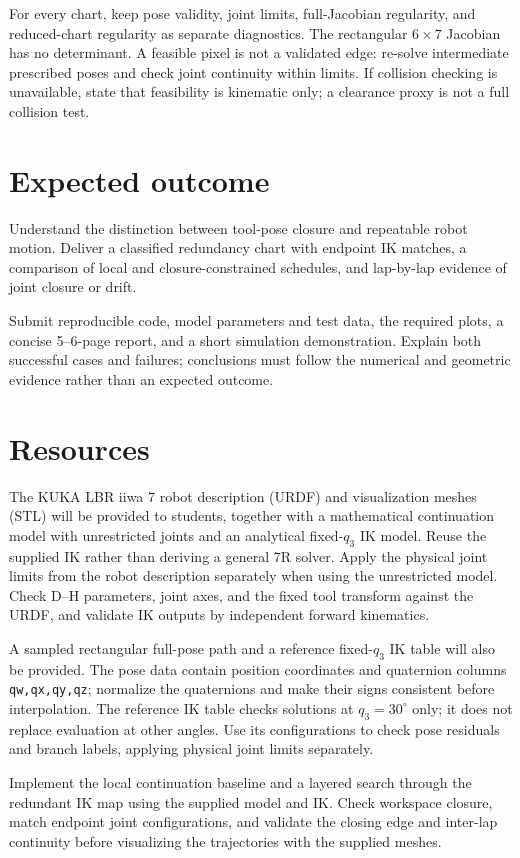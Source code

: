 \documentclass[11pt,a4paper]{article}
\begin{document}
For every chart, keep pose validity, joint limits,
full-Jacobian regularity, and reduced-chart regularity as separate diagnostics.
The rectangular $6\times7$ Jacobian has no determinant. A feasible pixel is
not a validated edge: re-solve intermediate prescribed poses and check joint
continuity within limits. If collision checking is unavailable, state that
feasibility is kinematic only; a clearance proxy is not a full collision test.

\section*{Expected outcome}
Understand the distinction between tool-pose closure and repeatable
robot motion. Deliver a classified redundancy chart with endpoint IK
matches, a comparison of local and closure-constrained schedules, and
lap-by-lap evidence of joint closure or drift.

Submit reproducible code, model parameters and test data, the required plots,
a concise 5--6-page report, and a short simulation demonstration. Explain
both successful cases and failures; conclusions must follow the numerical
and geometric evidence rather than an expected outcome.

\section*{Resources}
The KUKA LBR iiwa 7 robot description (URDF) and visualization meshes
(STL) will be provided to students, together with a mathematical continuation
model with unrestricted joints and an analytical fixed-$q_3$ IK model. Reuse
the supplied IK rather than deriving a general 7R solver. Apply the physical
joint limits from the robot description separately when using the unrestricted
model. Check D--H parameters, joint axes, and the fixed tool transform against
the URDF, and validate IK outputs by independent forward kinematics.

A sampled rectangular full-pose path and a reference fixed-$q_3$ IK
table will also be provided. The pose data contain position coordinates and
quaternion columns \texttt{qw,qx,qy,qz}; normalize the quaternions and make
their signs consistent before interpolation. The reference IK table checks
solutions at $q_3=30^\circ$ only; it does not replace evaluation at other angles.
Use its configurations to check pose residuals and branch labels, applying
physical joint limits separately.

Implement the local continuation baseline and a layered search through the
redundant IK map using the supplied model and IK. Check workspace closure,
match endpoint joint configurations, and validate the closing edge and
inter-lap continuity before visualizing the trajectories with the supplied
meshes.
\end{document}

